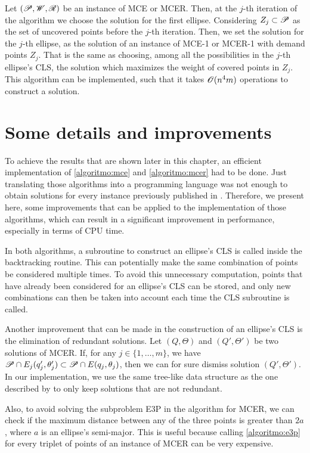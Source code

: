 Let $(\mathscr{P}, \mathscr{W}, \mathscr{R})$ be an instance of MCE or MCER. Then, at the $j$-th iteration of the algorithm we choose the solution for the first ellipse. Considering $Z_j \subset \mathscr{P}$ as the set of uncovered points before the $j$-th iteration. Then, we set the solution for the $j$-th ellipse, as the solution of an instance of MCE-1 or MCER-1 with demand points $Z_j$.
That is the same as choosing, among all the possibilities in the $j$-th ellipse's CLS, the solution which maximizes the weight of covered points in $Z_j$. This algorithm can be implemented, such that it takes $\mathscr{O}(n^4m)$ operations to construct a solution.



\section{Some details and improvements}\label{section:improvements}

To achieve the results that are shown later in this chapter, an efficient implementation of \autoref{algoritmo:mce} and \autoref{algoritmo:mcer} had to be done. Just translating those algorithms into a programming language was not enough to obtain solutions for every instance previously published in .
Therefore, we present here, some improvements that can be applied to the implementation of those algorithms, which can result in a significant improvement in performance, especially in terms of CPU time.

In both algorithms, a subroutine to construct an ellipse's CLS is called inside the backtracking routine. This can potentially make the same combination of points be considered multiple times.
To avoid this unnecessary computation, points that have already been considered for an ellipse's CLS can be stored, and only new combinations can then be taken into account each time the CLS subroutine is called. 

Another improvement that can be made in the construction of an ellipse's CLS is the elimination of redundant solutions.
Let $(Q, \Theta)$ and $(Q', \Theta')$ be two solutions of MCER. If, for any $j \in \{1, \dots, m\}$, we have $\mathscr{P} \cap E_j(q_j', \theta_j') \subset \mathscr{P} \cap E(q_j, \theta_j)$, then we can for sure dismiss solution $(Q', \Theta')$.
In our implementation, we use the same tree-like data structure as the one described by  to only keep solutions that are not redundant.

Also, to avoid solving the subproblem E3P in the algorithm for MCER, we can check if the maximum distance between any of the three points is greater than $2a$, where $a$ is an ellipse's semi-major. This is useful because calling \autoref{algoritmo:e3p} for every triplet of points of an instance of MCER can be very expensive.

